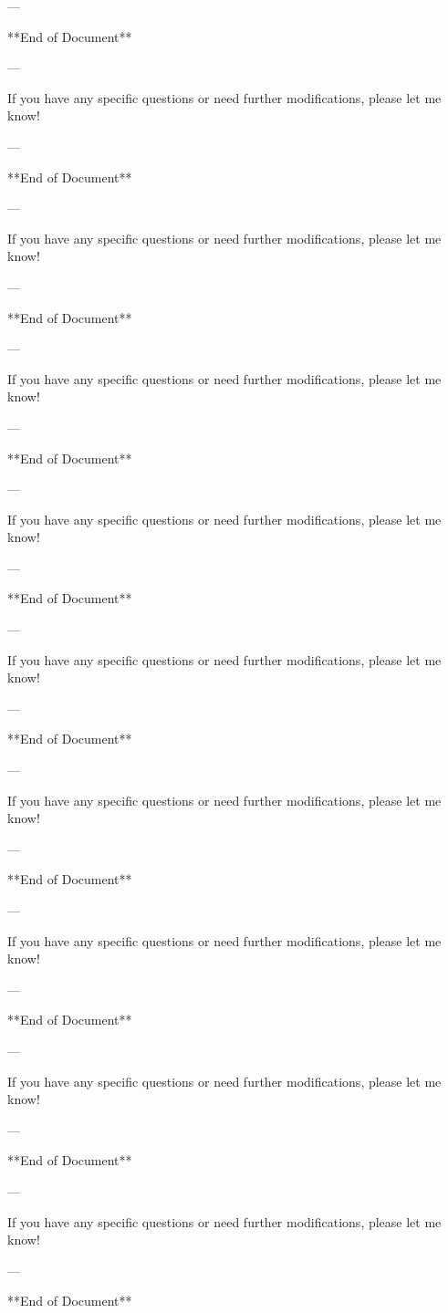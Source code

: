 --- 

**End of Document** 

--- 

If you have any specific questions or need further modifications, please let me know! 

--- 

**End of Document** 

--- 

If you have any specific questions or need further modifications, please let me know! 

--- 

**End of Document** 

--- 

If you have any specific questions or need further modifications, please let me know! 

--- 

**End of Document** 

--- 

If you have any specific questions or need further modifications, please let me know! 

--- 

**End of Document** 

--- 

If you have any specific questions or need further modifications, please let me know! 

--- 

**End of Document** 

--- 

If you have any specific questions or need further modifications, please let me know! 

--- 

**End of Document** 

--- 

If you have any specific questions or need further modifications, please let me know! 

--- 

**End of Document** 

--- 

If you have any specific questions or need further modifications, please let me know! 

--- 

**End of Document** 

--- 

If you have any specific questions or need further modifications, please let me know! 

--- 

**End of Document** 

